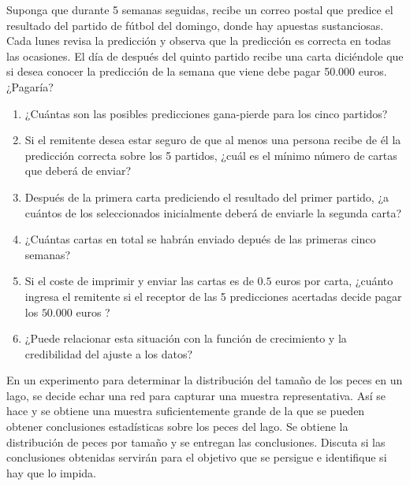\documentclass[12pt]{article}
\theoremstyle{definition}
\begin{document}
\begin{pregunta}
Suponga que durante 5 semanas seguidas, recibe un correo postal que predice el resultado del partido de fútbol del domingo, donde hay apuestas sustanciosas. Cada lunes revisa la predicción y observa que la predicción es correcta en todas las ocasiones. El día de después del quinto partido recibe una carta diciéndole que si desea conocer la predicción de la semana que viene debe pagar 50.000 euros. ¿Pagaría?
\begin{enumerate}[a]
\item ¿Cuántas son las posibles predicciones gana-pierde para los cinco partidos?
\item Si el remitente desea estar seguro de que al menos una persona recibe de él la predicción correcta sobre los 5 partidos, ¿cuál es el mínimo número de cartas que deberá de
enviar?
\item Después de la primera carta prediciendo el resultado del primer partido, ¿a cuántos de los seleccionados inicialmente deberá de enviarle la segunda carta?
\item ¿Cuántas cartas en total se habrán enviado depués de las primeras cinco semanas?
\item  Si el coste de imprimir y enviar las cartas es de $0.5$ euros por carta, ¿cuánto ingresa el remitente si el receptor de las 5 predicciones acertadas decide pagar los $50.000$ euros ?
\item ¿Puede relacionar esta situación con la función de crecimiento y la credibilidad del ajuste a los datos?
\end{enumerate}


\end{pregunta}

\begin{pregunta}
En un experimento para determinar la distribución del tamaño de los peces en un lago, se decide echar una red para capturar una muestra representativa. Así se hace y se obtiene una muestra suficientemente grande de la que se pueden obtener conclusiones estadísticas sobre los peces del lago. Se obtiene la distribución de peces por tamaño y se entregan las conclusiones. Discuta si las conclusiones obtenidas servirán para el objetivo que se persigue e identifique si hay que lo impida.\\


\end{pregunta}
\end{document}
